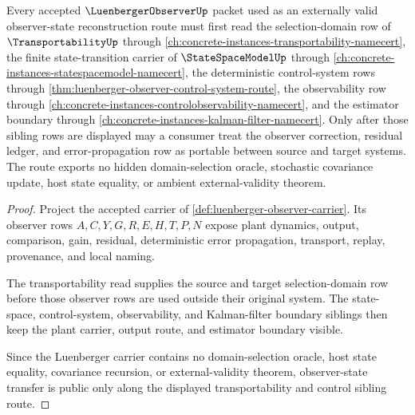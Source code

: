 \begin{theorem}
\label{thm:luenberger-observer-transportability-dependency-route}
Every accepted $\LuenbergerObserverUp$ packet used as an externally valid observer-state reconstruction route must first read the selection-domain row of $\TransportabilityUp$ through \autoref{ch:concrete-instances-transportability-namecert}, the finite state-transition carrier of $\StateSpaceModelUp$ through \autoref{ch:concrete-instances-statespacemodel-namecert}, the deterministic control-system rows through \autoref{thm:luenberger-observer-control-system-route}, the observability row through \autoref{ch:concrete-instances-controlobservability-namecert}, and the estimator boundary through \autoref{ch:concrete-instances-kalman-filter-namecert}. Only after those sibling rows are displayed may a consumer treat the observer correction, residual ledger, and error-propagation row as portable between source and target systems. The route exports no hidden domain-selection oracle, stochastic covariance update, host state equality, or ambient external-validity theorem.
\end{theorem}
\begin{proof}
Project the accepted carrier of \autoref{def:luenberger-observer-carrier}. Its observer rows $A,C,Y,G,R,E,H,T,P,N$ expose plant dynamics, output, comparison, gain, residual, deterministic error propagation, transport, replay, provenance, and local naming.

The transportability read supplies the source and target selection-domain row before those observer rows are used outside their original system. The state-space, control-system, observability, and Kalman-filter boundary siblings then keep the plant carrier, output route, and estimator boundary visible.

Since the Luenberger carrier contains no domain-selection oracle, host state equality, covariance recursion, or external-validity theorem, observer-state transfer is public only along the displayed transportability and control sibling route.
\end{proof}
